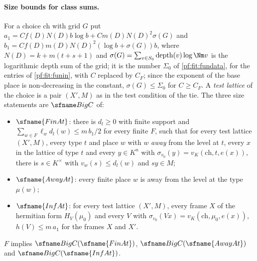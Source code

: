 \paragraph{Size bounds for class sums.}
For a choice $\mathrm{ch}$ with grid $G$ put $a_1=Cf(D)N(D)b\log b+Cm(D)N(D)^2\sigma(G)$ and
$b_1=Cf(D)m(D)N(D)^2(\log b+\sigma(G))b$, where $N(D)=k+m(t+s+1)$ and $\sigma(G)=\sum_{v\in S_0}\mathrm{depth}(v)\log\Nm v$
is the logarithmic depth sum of the grid; it is the number $\Sigma_0$ of \cref{pf:fit:fundata}, for the entries of
\cref{pf:fit:funin}, with $C$ replaced by $C_F$; since the exponent of the base place is non-decreasing in the constant,
$\sigma(G)\le\Sigma_0$ for $C\ge C_F$. A \emph{test lattice} of the
choice is a pair $(X',M)$ as in the test condition of the tie. The three size statements are $\fitBigC$ of:
\begin{itemize}
\item $\sfname{FinAt}$: there is $d_l\ge0$ with finite support and $\sum_{w\in F}\ell_wd_l(w)\le m\,b_1/2$ for every finite
$F$, such that for every test lattice $(X',M)$, every type $t$ and place $w$ with $w$ \emph{away} from the level at $t$, every
$x$ in the lattice of type $t$ and every $y\in K^n$ with $\sigma_{v_0}(y)=v_K(\mathrm{ch},t,e(x))$, there is $s\in K^\times$
with $v_w(s)\le d_l(w)$ and $sy\in M$;
\item $\sfname{AwayAt}$: every finite place $w$ is away from the level at the type $\mu(w)$;
\item $\sfname{InfAt}$: for every test lattice $(X',M)$, every frame $X$ of the hermitian form $H_V(\mu_0)$ and every $V$
with $\sigma_{v_0}(Vx)=v_K(\mathrm{ch},\mu_0,e(x))$, $h(V)\le m\,a_1$ for the frames $X$ and $X'$.
\end{itemize}

\begin{theorem}\label{pf:fit:sumsize}
$F$ implies $\fitBigC(\sfname{FinAt})$, $\fitBigC(\sfname{AwayAt})$ and $\fitBigC(\sfname{InfAt})$.
\end{theorem}

